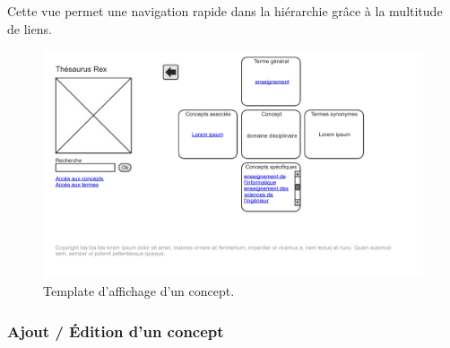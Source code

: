 Cette vue permet une navigation rapide dans la hiérarchie grâce à la multitude de liens.
\begin{figure}[H]
\begin{center}
\includegraphics[width=\textwidth]{files/template_concept}
\end{center}
\caption{Template d'affichage d'un concept.}
\end{figure}

\subsubsection{Ajout / Édition d'un concept}

